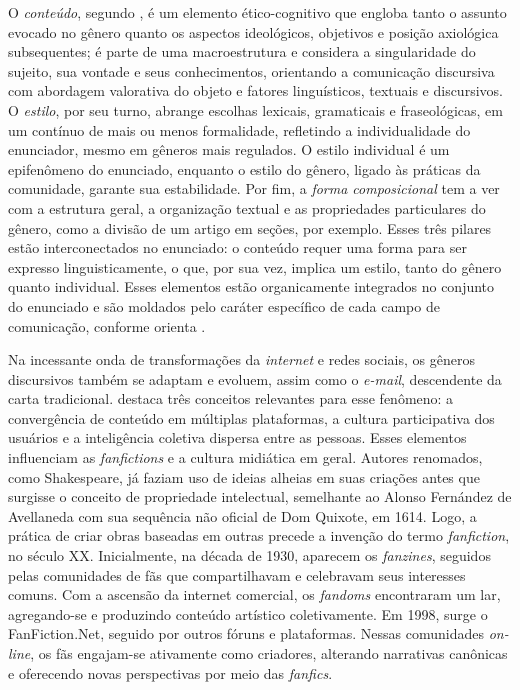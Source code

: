 O \emph{conteúdo}, segundo \textcite{bakhtin2010,bakhtin2011}, é um elemento
ético-cognitivo que engloba tanto o assunto evocado no gênero quanto os
aspectos ideológicos, objetivos e posição axiológica subsequentes; é
parte de uma macroestrutura e considera a singularidade do sujeito, sua
vontade e seus conhecimentos, orientando a comunicação discursiva com
abordagem valorativa do objeto e fatores linguísticos, textuais e
discursivos. O \emph{estilo}, por seu turno, abrange escolhas lexicais,
gramaticais e fraseológicas, em um contínuo de mais ou menos
formalidade, refletindo a individualidade do enunciador, mesmo em
gêneros mais regulados. O estilo individual é um epifenômeno do
enunciado, enquanto o estilo do gênero, ligado às práticas da
comunidade, garante sua estabilidade. Por fim, a \emph{forma
composicional} tem a ver com a estrutura geral, a organização textual e
as propriedades particulares do gênero, como a divisão de um artigo em
seções, por exemplo. Esses três pilares estão interconectados no
enunciado: o conteúdo requer uma forma para ser expresso
linguisticamente, o que, por sua vez, implica um estilo, tanto do gênero
quanto individual. Esses elementos estão organicamente integrados no
conjunto do enunciado e são moldados pelo caráter específico de cada
campo de comunicação, conforme orienta \textcite{bakhtin2011}.

Na incessante onda de transformações da \emph{internet} e redes sociais,
os gêneros discursivos também se adaptam e evoluem, assim como o
\emph{e-mail}, descendente da carta tradicional. \textcite{jenkins2009} destaca
três conceitos relevantes para esse fenômeno: a convergência de conteúdo
em múltiplas plataformas, a cultura participativa dos usuários e a
inteligência coletiva dispersa entre as pessoas. Esses elementos
influenciam as \emph{fanfictions} e a cultura midiática em geral.
Autores renomados, como Shakespeare, já faziam uso de ideias alheias em
suas criações antes que surgisse o conceito de propriedade intelectual,
semelhante ao Alonso Fernández de Avellaneda com sua sequência não
oficial de Dom Quixote, em 1614. Logo, a prática de criar obras baseadas
em outras precede a invenção do termo \emph{fanfiction}, no século XX.
Inicialmente, na década de 1930, aparecem os \emph{fanzines}, seguidos
pelas comunidades de fãs que compartilhavam e celebravam seus interesses
comuns. Com a ascensão da internet comercial, os \emph{fandoms}
encontraram um lar, agregando-se e produzindo conteúdo artístico
coletivamente. Em 1998, surge o FanFiction.Net, seguido por outros
fóruns e plataformas. Nessas comunidades \emph{on-line}, os fãs
engajam-se ativamente como criadores, alterando narrativas canônicas e
oferecendo novas perspectivas por meio das \emph{fanfics}.

